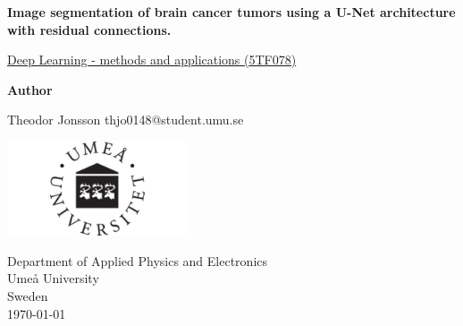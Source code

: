 \begin{titlepage}
\begin{center}
        \vspace*{1cm}
            
        \Huge
        \textbf{Image segmentation of brain cancer tumors using a U-Net architecture with residual connections.}
            
        \vspace{0.5cm}
        \LARGE
        \href{https://www.umu.se/utbildning/kursplan/5tf078/rev/32737/}{Deep Learning - methods and applications (5TF078)}

            
        \vspace{1.5cm}
        \large
            
        \textbf{Author}
       
        Theodor Jonsson  thjo0148@student.umu.se\\

       
    

        
         
        
        \vfill

       
            
            
        \vspace{0.8cm}
            
        \includegraphics[width=0.4\textwidth]{university}
        
          
        \Large
        Department of Applied Physics and Electronics\\
        Umeå University\\
        Sweden\\
        \today
            
    \end{center}
    
\end{titlepage}
